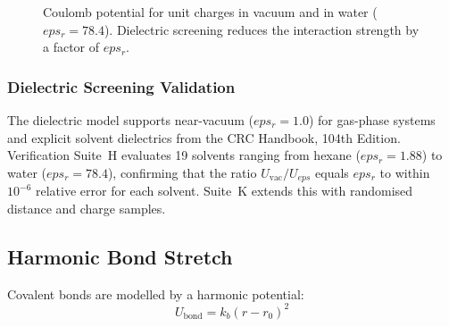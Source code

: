 \documentclass[11pt,twoside]{article}
\def\AA{Ang}%
\def\varepsilon{eps}%
\begin{document}
\begin{figure}[H]
\centering
{}
\caption{Coulomb potential for unit charges in vacuum and in water ($\varepsilon_r = 78.4$). Dielectric screening reduces the interaction strength by a factor of $\varepsilon_r$.}
\label{fig:coulomb}
\end{figure}

\subsubsection{Dielectric Screening Validation}

The dielectric model supports near-vacuum ($\varepsilon_r = 1.0$) for gas-phase systems and explicit solvent dielectrics from the CRC Handbook, 104th Edition. Verification Suite~H evaluates 19 solvents ranging from hexane ($\varepsilon_r = 1.88$) to water ($\varepsilon_r = 78.4$), confirming that the ratio $U_{\mathrm{vac}} / U_{\varepsilon}$ equals $\varepsilon_r$ to within $10^{-6}$ relative error for each solvent. Suite~K extends this with randomised distance and charge samples.

\subsection{Harmonic Bond Stretch}

Covalent bonds are modelled by a harmonic potential:
\begin{equation}
  U_{\mathrm{bond}} = k_b (r - r_0)^2
  \label{eq:bond}
\end{equation}
\end{document}
